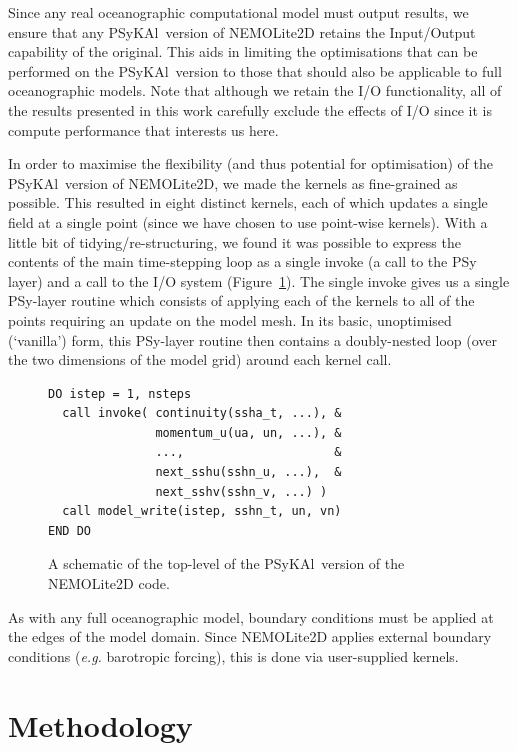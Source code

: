 \documentclass[journal]{IEEEtran}
\newcommand{\psykal}{{PS}y{KA}l}
\begin{document}
Since any real oceanographic computational model must output results,
we ensure that any \psykal\ version of NEMOLite2D retains the Input/Output
capability of the original. This aids in limiting the optimisations
that can be performed on the \psykal\ version to those that should also
be applicable to full oceanographic models. Note that although we
retain the I/O functionality, all of the results presented in this work
carefully exclude the effects of I/O since it is compute performance
that interests us here.

In order to maximise the flexibility (and thus potential for
optimisation) of the \psykal\ version of NEMOLite2D, we made the
kernels as fine-grained as possible. This resulted in eight distinct
kernels, each of which updates a single field at a single point (since
we have chosen to use point-wise kernels). With a little bit of
tidying/re-structuring, we found it was possible to express the
contents of the main time-stepping loop as a single invoke (a call to
the PSy layer) and a call to the I/O system
(Figure~\ref{FIG_psykal_nemolite2d_structure}). The single invoke
gives us a single PSy-layer routine which consists of applying each of
the kernels to all of the points requiring an update on the model
mesh. In its basic, unoptimised (`vanilla') form, this PSy-layer
routine then contains a doubly-nested loop (over the two dimensions of
the model grid) around each kernel call.

\begin{figure}
\centering
\begin{verbatim}
DO istep = 1, nsteps
  call invoke( continuity(ssha_t, ...), &
               momentum_u(ua, un, ...), &
               ...,                     &
               next_sshu(sshn_u, ...),  &
               next_sshv(sshn_v, ...) )
  call model_write(istep, sshn_t, un, vn)
END DO
\end{verbatim}
\caption{A schematic of the top-level of the \psykal\ version of the
 NEMOLite2D code.}
\label{FIG_psykal_nemolite2d_structure}
\end{figure}

As with any full oceanographic model, boundary conditions must be
applied at the edges of the model domain. Since NEMOLite2D applies
external boundary conditions ({\it e.g.} barotropic forcing), this is
done via user-supplied kernels.


\section{Methodology}
\label{sec_methodology}
\end{document}
